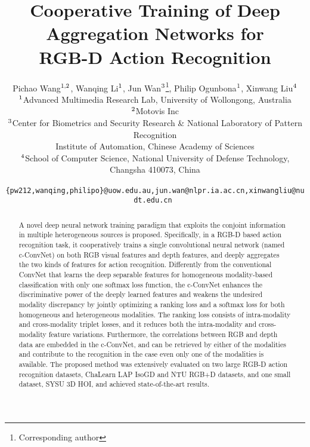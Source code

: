 \documentclass[letterpaper]{article} %
\begin{document}
\title{Cooperative Training of Deep Aggregation Networks for \\RGB-D Action
Recognition}
\author{Pichao Wang$^{\rm 1,2}$, Wanqing Li$^{\rm 1}$, Jun Wan$^{\rm 3}$\thanks{Corresponding author}, Philip Ogunbona$^{\rm 1}$, Xinwang Liu$^{\rm 4}$ \\
$^{\rm 1}$Advanced Multimedia Research Lab, University of Wollongong, Australia\\
$^{\rm 2}$Motovis Inc\\
$^{\rm 3}$Center for Biometrics and Security Research \& National Laboratory of Pattern Recognition\\ Institute of Automation, Chinese Academy of Sciences \\
$^{\rm 4}$School of Computer Science, National University of Defense Technology, Changsha 410073, China \\
{\tt\footnotesize %
\{pw212,wanqing,philipo\}@uow.edu.au,jun.wan@nlpr.ia.ac.cn,xinwangliu@nudt.edu.cn
}\\
}
\maketitle
\begin{abstract}
A novel deep neural network training paradigm that exploits the conjoint information in multiple heterogeneous sources is proposed. Specifically, in a RGB-D based action recognition task, it cooperatively trains a single convolutional neural network (named c-ConvNet) on both RGB visual features and depth features, and deeply aggregates the two kinds of features for action recognition. Differently from the conventional ConvNet that learns the deep separable features for homogeneous modality-based classification with only one softmax loss function, the c-ConvNet enhances the discriminative power of the deeply learned features and weakens the undesired modality discrepancy by jointly optimizing a ranking loss and a softmax loss for both homogeneous and heterogeneous modalities. The ranking loss consists of intra-modality and cross-modality triplet losses, and it reduces both the intra-modality and cross-modality feature variations. Furthermore, the correlations between RGB and depth data are embedded in the c-ConvNet, and can be retrieved by either of the modalities and contribute to the recognition in the case even only one of the modalities is available. The proposed method was extensively evaluated on two large RGB-D action recognition datasets, ChaLearn LAP IsoGD and NTU RGB+D datasets, and one small dataset, SYSU 3D HOI, and achieved state-of-the-art results.
\end{abstract}
\end{document}
